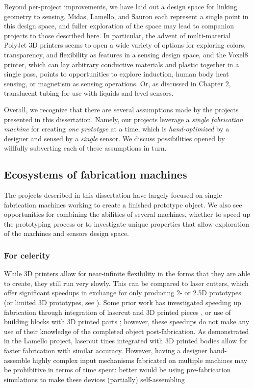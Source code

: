 Beyond per-project improvements, we have laid out a design space for linking geometry to sensing. Midas, Lamello, and Sauron each represent a single point in this design space, and fuller exploration of the space may lead to companion projects to those described here. In particular, the advent of multi-material PolyJet 3D printers seems to open a wide variety of options for exploring colors, transparency, and flexibility as features in a sensing design space, and the Voxel8 \cite{voxel8} printer, which can lay arbitrary conductive materials and plastic together in a single pass, points to opportunities to explore induction, human body heat sensing, or magnetism as sensing operations. Or, as discussed in Chapter 2, translucent tubing for use with liquids and level sensors.

Overall, we recognize that there are several assumptions made by the projects presented in this dissertation. Namely, our projects leverage a \emph{single fabrication machine} for creating \emph{one prototype} at a time, which is \emph{hand-optimized} by a designer and sensed by a \emph{single} sensor. We discuss possibilities opened by willfully subverting each of these assumptions in turn.

\subsection{Ecosystems of fabrication machines}

The projects described in this dissertation have largely focused on single fabrication machines working to create a finished prototype object. We also see opportunities for combining the abilities of several machines, whether to speed up the prototyping process or to investigate unique properties that allow exploration of the machines and sensors design space.

    \subsubsection{For celerity}

    While 3D printers allow for near-infinite flexibility in the forms that they are able to create, they still run very slowly. This can be compared to laser cutters, which offer significant speedups in exchange for only producing 2- or 2.5D prototypes (or limited 3D prototypes, see \cite{mueller-laserorigami}). Some prior work has investigated speeding up fabrication through integration of lasercut and 3D printed pieces \cite{beyer-platener}, or use of building blocks with 3D printed parts \cite{mueller-fabrickation}; however, these speedups do not make any use of their knowledge of the completed object post-fabrication. As demonstrated in the Lamello project, lasercut tines integrated with 3D printed bodies allow for faster fabrication with similar accuracy. However, having a designer hand-assemble highly complex input mechanisms fabricated on multiple machines may be prohibitive in terms of time spent: better would be using pre-fabrication simulations to make these devices (partially) self-assembling \cite{tibbits-self-assembly}.

